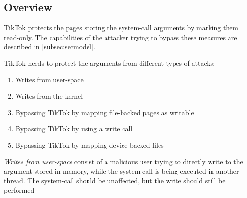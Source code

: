
\subsection{Overview}
\label{subsec:designoverview}

TikTok protects the pages storing the system-call arguments by marking them
read-only. The capabilities of the attacker trying to bypass these measures
are described in \cref{subsec:secmodel}.


TikTok needs to protect the arguments from different types of attacks:

\begin{enumerate}
  \item \label{first} Writes from user-space
  \item \label{second} Writes from the kernel
  \item \label{third} Bypassing TikTok by mapping file-backed pages as writable
  \item \label{fourth} Bypassing TikTok by using a write call
  \item \label{fifth} Bypassing TikTok by mapping device-backed files
\end{enumerate}

\emph{Writes from user-space} consist of a malicious user trying to directly
write to the argument stored in memory, while the system-call is being executed
in another thread. The system-call should be unaffected, but the write should
still be performed.

